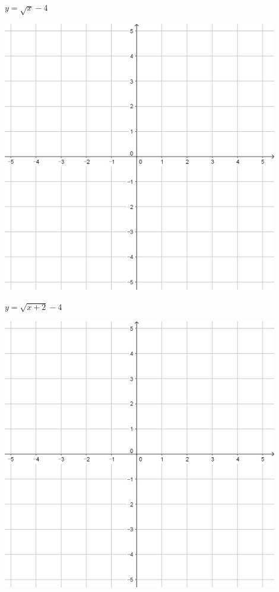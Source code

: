 \documentclass[a4paper]{oblivoir}
\begin{document}
\begin{minipage}{0.45\textwidth}\centering
\(y=\sqrt{x}-4\)
\par\bigskip\includegraphics[width=0.9\textwidth]{55}
\end{minipage}
\begin{minipage}{0.45\textwidth}\centering
\(y=\sqrt{x+2}-4\)
\par\bigskip\includegraphics[width=0.9\textwidth]{55}
\end{minipage}\bigskip\bigskip\par
\end{document}
